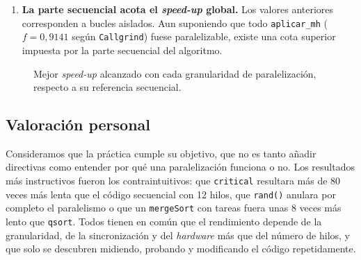 \documentclass[12pt]{article}
\begin{document}
\begin{enumerate}
\begin{enumerate}
    \item \textbf{La parte secuencial acota el \textit{speed-up} global.} Los 
    valores anteriores corresponden a bucles aislados. Aun suponiendo que todo 
    \texttt{aplicar\_mh} ($f = 0{,}9141$ según \texttt{Callgrind}) fuese paralelizable,
    existe una cota superior impuesta por la parte secuencial del algoritmo.

\end{enumerate}

\begin{figure}[htbp]
    \centering
    \caption{Mejor \textit{speed-up} alcanzado con cada granularidad de paralelización, respecto a su referencia secuencial.}
    \label{fig:c9_speedup}
\end{figure}

\subsection*{Valoración personal}

Consideramos que la práctica cumple su objetivo, que no es tanto añadir 
directivas como entender por qué una paralelización funciona o no. Los 
resultados más instructivos fueron los contraintuitivos: que \texttt{critical} 
resultara más de 80 veces más lenta que el código secuencial con 12 hilos, que 
\texttt{rand()} anulara por completo el paralelismo o que un \texttt{mergeSort} 
con tareas fuera unas 8 veces más lento que \texttt{qsort}. Todos tienen en común
 que el rendimiento depende de la granularidad, de la sincronización y del 
 \textit{hardware} más que del número de hilos, y que solo se descubren midiendo, probando y modificando 
 el código repetidamente.



\end{enumerate}
\end{document}
